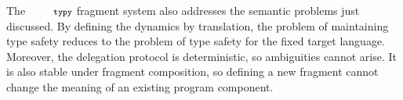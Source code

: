 \documentclass[10pt]{sigplanconf}
\newcommand{\typy}{\texttt{\footnotesize typy}}
\begin{document}
The $\typy$ fragment system also addresses the semantic problems just discussed. By defining the dynamics by translation, the problem of maintaining type safety reduces to the problem of type safety for the fixed target language. Moreover, the delegation protocol is deterministic, so ambiguities cannot arise. It is also stable under fragment composition, so defining a new fragment cannot change the meaning of an existing program component. 


\end{document}
